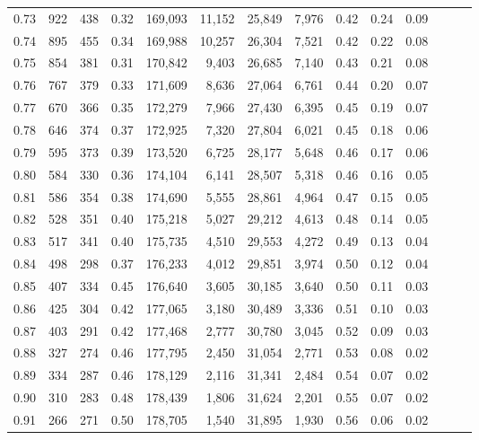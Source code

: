 \begin{tabular}{rrrrrrrrrrrrrr}
0.73 &    922 &  438 &  0.32 &  169,093 &   11,152 &  25,849 &   7,976 &  0.42 &  0.24 &      0.09 \\
0.74 &    895 &  455 &  0.34 &  169,988 &   10,257 &  26,304 &   7,521 &  0.42 &  0.22 &      0.08 \\
0.75 &    854 &  381 &  0.31 &  170,842 &    9,403 &  26,685 &   7,140 &  0.43 &  0.21 &      0.08 \\
0.76 &    767 &  379 &  0.33 &  171,609 &    8,636 &  27,064 &   6,761 &  0.44 &  0.20 &      0.07 \\
0.77 &    670 &  366 &  0.35 &  172,279 &    7,966 &  27,430 &   6,395 &  0.45 &  0.19 &      0.07 \\
0.78 &    646 &  374 &  0.37 &  172,925 &    7,320 &  27,804 &   6,021 &  0.45 &  0.18 &      0.06 \\
0.79 &    595 &  373 &  0.39 &  173,520 &    6,725 &  28,177 &   5,648 &  0.46 &  0.17 &      0.06 \\
0.80 &    584 &  330 &  0.36 &  174,104 &    6,141 &  28,507 &   5,318 &  0.46 &  0.16 &      0.05 \\
0.81 &    586 &  354 &  0.38 &  174,690 &    5,555 &  28,861 &   4,964 &  0.47 &  0.15 &      0.05 \\
0.82 &    528 &  351 &  0.40 &  175,218 &    5,027 &  29,212 &   4,613 &  0.48 &  0.14 &      0.05 \\
0.83 &    517 &  341 &  0.40 &  175,735 &    4,510 &  29,553 &   4,272 &  0.49 &  0.13 &      0.04 \\
0.84 &    498 &  298 &  0.37 &  176,233 &    4,012 &  29,851 &   3,974 &  0.50 &  0.12 &      0.04 \\
0.85 &    407 &  334 &  0.45 &  176,640 &    3,605 &  30,185 &   3,640 &  0.50 &  0.11 &      0.03 \\
0.86 &    425 &  304 &  0.42 &  177,065 &    3,180 &  30,489 &   3,336 &  0.51 &  0.10 &      0.03 \\
0.87 &    403 &  291 &  0.42 &  177,468 &    2,777 &  30,780 &   3,045 &  0.52 &  0.09 &      0.03 \\
0.88 &    327 &  274 &  0.46 &  177,795 &    2,450 &  31,054 &   2,771 &  0.53 &  0.08 &      0.02 \\
0.89 &    334 &  287 &  0.46 &  178,129 &    2,116 &  31,341 &   2,484 &  0.54 &  0.07 &      0.02 \\
0.90 &    310 &  283 &  0.48 &  178,439 &    1,806 &  31,624 &   2,201 &  0.55 &  0.07 &      0.02 \\
0.91 &    266 &  271 &  0.50 &  178,705 &    1,540 &  31,895 &   1,930 &  0.56 &  0.06 &      0.02 \\

\end{tabular}
